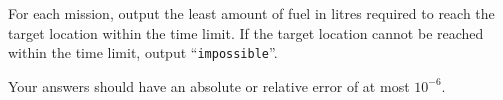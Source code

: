 
  For each mission, output the least amount of fuel in litres required to reach the target location within the time limit.
  If the target location cannot be reached within the time limit, output ``\texttt{impossible}''.

  Your answers should have an absolute or relative error of at most $10^{-6}$.
